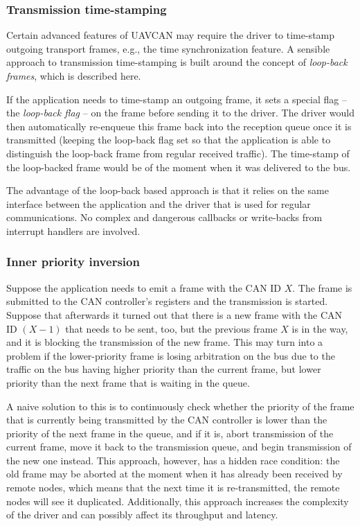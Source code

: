 \subsubsection{Transmission time-stamping}

Certain advanced features of UAVCAN may require the driver to time-stamp outgoing transport frames, e.g.,
the time synchronization feature.
A sensible approach to transmission time-stamping is built around the concept of \emph{loop-back frames},
which is described here.

If the application needs to time-stamp an outgoing frame, it sets a special flag -- the \emph{loop-back flag} --
on the frame before sending it to the driver.
The driver would then automatically re-enqueue this frame back into the reception queue once it is transmitted
(keeping the loop-back flag set so that the application is able to distinguish the loop-back
frame from regular received traffic).
The time-stamp of the loop-backed frame would be of the moment when it was delivered to the bus.

The advantage of the loop-back based approach is that it relies on the same interface between
the application and the driver that is used for regular communications.
No complex and dangerous callbacks or write-backs from interrupt handlers are involved.

\subsubsection{Inner priority inversion}

Suppose the application needs to emit a frame with the CAN ID $X$.
The frame is submitted to the CAN controller's registers and the transmission is started.
Suppose that afterwards it turned out that there is a new frame with the CAN ID $(X-1)$ that needs to be sent,
too, but the previous frame $X$ is in the way, and it is blocking the transmission of the new frame.
This may turn into a problem if the lower-priority frame is losing arbitration on the bus due
to the traffic on the bus having higher priority than the current frame,
but lower priority than the next frame that is waiting in the queue.

A naive solution to this is to continuously check whether the priority of the frame that is currently being
transmitted by the CAN controller is lower than the priority of the next frame in the queue, and if it is,
abort transmission of the current frame, move it back to the transmission queue,
and begin transmission of the new one instead.
This approach, however, has a hidden race condition:
the old frame may be aborted at the moment when it has already been received by remote nodes,
which means that the next time it is re-transmitted, the remote nodes will see it duplicated.
Additionally, this approach increases the complexity of the driver and can possibly affect
its throughput and latency.

